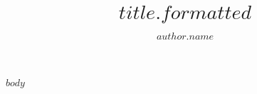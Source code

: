 \documentclass[journal=$journal$,manuscript=$type$]{achemso}
\author{$author.name$}
\affiliation{$author.aff$}
\title[$title.short$]{$title.formatted$}
\begin{document}
$body$
\end{document}
